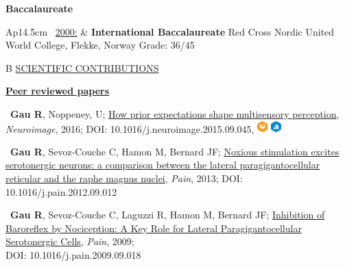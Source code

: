 \documentclass[a4paper,12pt,oneside]{letter}
\begin{document}
{\begin{center}
 \large\textbf{Baccalaureate}
\end{center}

\begin{tabular}{Ap{14.5cm}}
\textbullet~\underline{2000:} & \large\textbf{International Baccalaureate} \newline
				\normalsize Red Cross Nordic United World College, Flekke, Norway \newline
				Grade: 36/45 \\
\end{tabular}


\medskip 

\begin{tabular}{B}
 \underline{SCIENTIFIC CONTRIBUTIONS}
\end{tabular}


\begin{center}
  \href{https://osf.io/4h63t/}{\large\textbf{Peer reviewed papers}}
\end{center}

\textbullet~\textbf{Gau R}, Noppeney, U; 
\href{http://www.sciencedirect.com/science/article/pii/S1053811915008605}{How prior expectations shape multisensory perception}, \textit{Neuroimage}, 2016; DOI: 10.1016/j.neuroimage.2015.09.045,  \href{https://github.com/Remi-Gau/McGurk_prior_code}{\includegraphics[width=0.4cm]{materials_small_color.png}} \href{https://identifiers.org/neurovault.collection:4172}{\includegraphics[width=0.4cm]{data_small_color.png}}

\textbullet~\textbf{Gau R}, Sevoz-Couche C, Hamon M, Bernard JF; 
\href{http://www.researchgate.net/profile/Remi_Gau/publication/233394350_Noxious_stimulation_excites_serotonergic_neurons_A_comparison_between_the_lateral_paragigantocellular_reticular_and_the_raphe_magnus_nuclei/links/586bf62508aebf17d3a5b232.pdf}{Noxious stimulation excites serotonergic neurons: a comparison between the lateral paragigantocellular reticular and the raphe magnus nuclei}, \textit{Pain}, 2013; DOI: 10.1016/j.pain.2012.09.012

\textbullet~\textbf{Gau R}, Sevoz-Couche C, Laguzzi R, Hamon M, Bernard JF; \href{http://www.researchgate.net/profile/Remi_Gau/publication/38057329_Inhibition_of_cardiac_baroreflex_by_noxious_thermal_stimuli_A_key_role_for_lateral_paragigantocellular_serotonergic_cells/links/586bf90d08ae8fce4919e188.pdf}{Inhibition of Baroreflex by Nociception: A Key Role for Lateral Paragigantocellular Serotonergic Cells}, \textit{Pain}, 2009; \\DOI: 10.1016/j.pain.2009.09.018

}
\end{document}
